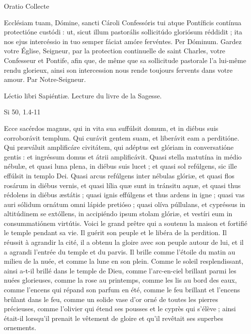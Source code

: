 \begin{paracol}{2}
Oratio
\switchcolumn
Collecte
\switchcolumn*

Ecclésiam tuam, Dómine, sancti  Cároli Confessóris tui atque Pontíficis contínua protectióne custódi : ut, sicut illum pastorális sollicitúdo gloriósum réddidit ; ita nos ejus intercéssio in tuo semper fáciat amóre fervéntes. Per Dóminum.
\switchcolumn
Gardez votre Église, Seigneur, par la protection continuelle de saint Charles, votre Confesseur et Pontife, afin que, de même que sa sollicitude pastorale l’a lui-même rendu glorieux, ainsi son intercession nous rende toujours fervents dans votre amour. Par Notre-Seigneur.
\switchcolumn*

Léctio libri Sapiéntiæ.
\switchcolumn
Lecture du livre de la Sagesse.
\switchcolumn*

Si 50, 1.4-11
\switchcolumn

\switchcolumn*

Ecce sacérdos magnus, qui in vita  sua suffúlsit domum, et in diébus suis corroborávit templum. Qui curávit gentem suam, et liberávit eam a perditióne. Qui præváluit amplificáre civitátem, qui adéptus est glóriam in conversatióne gentis : et ingréssum domus et átrii amplificávit. Quasi stella matutína in médio nébulæ, et quasi luna plena, in diébus suis lucet ; et quasi sol refúlgens, sic ille effúlsit in templo Dei. Quasi arcus refúlgens inter nébulas glóriæ, et quasi flos rosárum in diébus vernis, et quasi lília quæ sunt in tránsitu aquæ, et quasi thus rédolens in diébus æstátis ; quasi ignis effúlgens et thus ardens in igne ; quasi vas auri sólidum ornátum omni lápide pretióso ; quasi olíva púllulans, et cypréssus in altitúdinem se extóllens, in accipiéndo ipsum stolam glóriæ, et vestíri eum in consummatiónem virtútis.
\switchcolumn
Voici le grand prêtre qui a soutenu la  maison et fortifié le temple pendant sa vie. Il guérit son peuple et le libéra de la perdition. Il réussit à agrandir la cité, il a obtenu la gloire avec son peuple autour de lui, et il a agrandi l’entrée du temple et du parvis. Il brille comme l’étoile du matin au milieu de la nuée, et comme la lune en son plein. Comme le soleil resplendissant, ainsi a-t-il brillé dans le temple de Dieu, comme l’arc-en-ciel brillant parmi les nuées glorieuses, comme la rose au printemps, comme les lis au bord des eaux, comme l’encens qui répand son parfum en été, comme le feu brillant et l’encens brûlant dans le feu, comme un solide vase d’or orné de toutes les pierres précieuses, comme l’olivier qui étend ses pousses et le cyprès qui s’élève ; ainsi était-il lorsqu’il prenait le vêtement de gloire et qu’il revêtait ses superbes ornements.
\switchcolumn*


\end{paracol}

